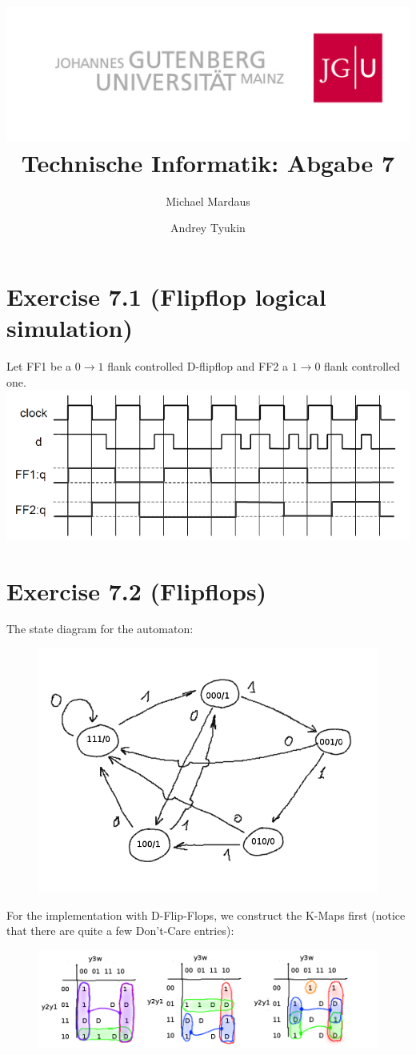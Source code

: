 \documentclass[10pt,a4paper]{scrartcl}
\author{Michael Mardaus \and Andrey Tyukin}
\title{\includegraphics[scale=0.2]{../logo_schriftzug}\\
Technische Informatik: Abgabe 7}
\newcommand{\subExercise}[1]{\vspace{0.5em} \noindent{\bf #1)}}
\begin{document}
\maketitle

\section*{Exercise 7.1 (Flipflop logical simulation)}
Let FF1 be a $0\rightarrow 1$ flank controlled D-flipflop and FF2 a $1\rightarrow0$ flank controlled one.\\
\includegraphics[width=\textwidth]{images/flipflop-sim.png} 

\FloatBarrier
\section*{Exercise 7.2 (Flipflops)}

\subExercise{a} The state diagram for the automaton:

\begin{figure}[h]
  \includegraphics[width=0.5\linewidth]{images/exercise_7_2_a.png}
\end{figure}

\subExercise{b} For the implementation with D-Flip-Flops, we construct the K-Maps first
(notice that there are quite a few Don't-Care entries):
\begin{figure}[h]
  \includegraphics[width=\linewidth]{images/exercise_7_2_b.png}
\end{figure}
\end{document}
